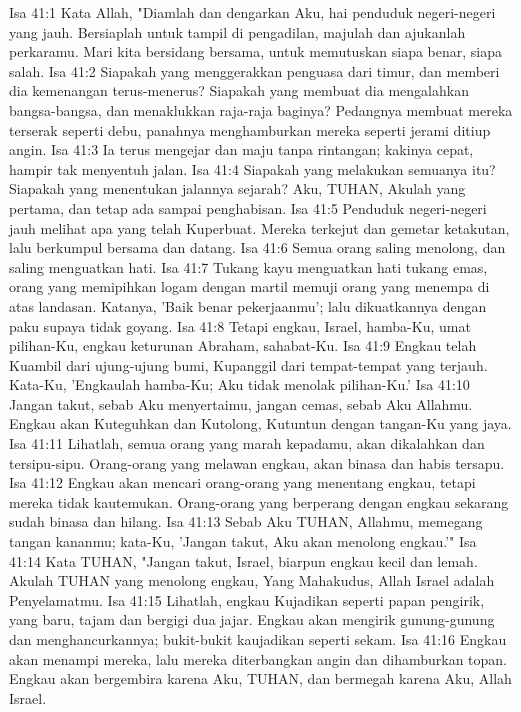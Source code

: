 Isa 41:1  Kata Allah, "Diamlah dan dengarkan Aku, hai penduduk negeri-negeri yang jauh. Bersiaplah untuk tampil di pengadilan, majulah dan ajukanlah perkaramu. Mari kita bersidang bersama, untuk memutuskan siapa benar, siapa salah.
Isa 41:2  Siapakah yang menggerakkan penguasa dari timur, dan memberi dia kemenangan terus-menerus? Siapakah yang membuat dia mengalahkan bangsa-bangsa, dan menaklukkan raja-raja baginya? Pedangnya membuat mereka terserak seperti debu, panahnya menghamburkan mereka seperti jerami ditiup angin.
Isa 41:3  Ia terus mengejar dan maju tanpa rintangan; kakinya cepat, hampir tak menyentuh jalan.
Isa 41:4  Siapakah yang melakukan semuanya itu? Siapakah yang menentukan jalannya sejarah? Aku, TUHAN, Akulah yang pertama, dan tetap ada sampai penghabisan.
Isa 41:5  Penduduk negeri-negeri jauh melihat apa yang telah Kuperbuat. Mereka terkejut dan gemetar ketakutan, lalu berkumpul bersama dan datang.
Isa 41:6  Semua orang saling menolong, dan saling menguatkan hati.
Isa 41:7  Tukang kayu menguatkan hati tukang emas, orang yang memipihkan logam dengan martil memuji orang yang menempa di atas landasan. Katanya, 'Baik benar pekerjaanmu'; lalu dikuatkannya dengan paku supaya tidak goyang.
Isa 41:8  Tetapi engkau, Israel, hamba-Ku, umat pilihan-Ku, engkau keturunan Abraham, sahabat-Ku.
Isa 41:9  Engkau telah Kuambil dari ujung-ujung bumi, Kupanggil dari tempat-tempat yang terjauh. Kata-Ku, 'Engkaulah hamba-Ku; Aku tidak menolak pilihan-Ku.'
Isa 41:10  Jangan takut, sebab Aku menyertaimu, jangan cemas, sebab Aku Allahmu. Engkau akan Kuteguhkan dan Kutolong, Kutuntun dengan tangan-Ku yang jaya.
Isa 41:11  Lihatlah, semua orang yang marah kepadamu, akan dikalahkan dan tersipu-sipu. Orang-orang yang melawan engkau, akan binasa dan habis tersapu.
Isa 41:12  Engkau akan mencari orang-orang yang menentang engkau, tetapi mereka tidak kautemukan. Orang-orang yang berperang dengan engkau sekarang sudah binasa dan hilang.
Isa 41:13  Sebab Aku TUHAN, Allahmu, memegang tangan kananmu; kata-Ku, 'Jangan takut, Aku akan menolong engkau.'"
Isa 41:14  Kata TUHAN, "Jangan takut, Israel, biarpun engkau kecil dan lemah. Akulah TUHAN yang menolong engkau, Yang Mahakudus, Allah Israel adalah Penyelamatmu.
Isa 41:15  Lihatlah, engkau Kujadikan seperti papan pengirik, yang baru, tajam dan bergigi dua jajar. Engkau akan mengirik gunung-gunung dan menghancurkannya; bukit-bukit kaujadikan seperti sekam.
Isa 41:16  Engkau akan menampi mereka, lalu mereka diterbangkan angin dan dihamburkan topan. Engkau akan bergembira karena Aku, TUHAN, dan bermegah karena Aku, Allah Israel.

